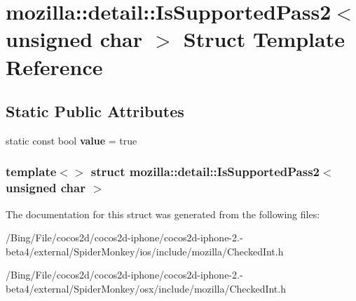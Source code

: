 \hypertarget{structmozilla_1_1detail_1_1_is_supported_pass2_3_01unsigned_01char_01_4}{\section{mozilla\-:\-:detail\-:\-:Is\-Supported\-Pass2$<$ unsigned char $>$ Struct Template Reference}
\label{structmozilla_1_1detail_1_1_is_supported_pass2_3_01unsigned_01char_01_4}
}
\subsection*{Static Public Attributes}
\begin{DoxyCompactItemize}
\item 
\hypertarget{structmozilla_1_1detail_1_1_is_supported_pass2_3_01unsigned_01char_01_4_a4cb5e46085eec685c8ddd9ab888fe4c7}{static const bool {\bfseries value} = true}\label{structmozilla_1_1detail_1_1_is_supported_pass2_3_01unsigned_01char_01_4_a4cb5e46085eec685c8ddd9ab888fe4c7}

\end{DoxyCompactItemize}
\subsubsection*{template$<$$>$ struct mozilla\-::detail\-::\-Is\-Supported\-Pass2$<$ unsigned char $>$}



The documentation for this struct was generated from the following files\-:\begin{DoxyCompactItemize}
\item 
/\-Bing/\-File/cocos2d/cocos2d-\/iphone/cocos2d-\/iphone-\/2.-\/beta4/external/\-Spider\-Monkey/ios/include/mozilla/Checked\-Int.\-h\item 
/\-Bing/\-File/cocos2d/cocos2d-\/iphone/cocos2d-\/iphone-\/2.-\/beta4/external/\-Spider\-Monkey/osx/include/mozilla/Checked\-Int.\-h\end{DoxyCompactItemize}
